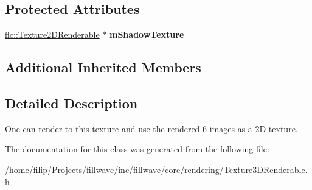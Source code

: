 \subsection*{Protected Attributes}
\begin{DoxyCompactItemize}
\item 
\hyperlink{classflw_1_1flc_1_1Texture2DRenderable}{flc\+::\+Texture2\+D\+Renderable} $\ast$ {\bfseries m\+Shadow\+Texture}\hypertarget{classflw_1_1flc_1_1Texture3DRenderable_a11a85d5786b2e207bccbb6a51f82ea9d}{}\label{classflw_1_1flc_1_1Texture3DRenderable_a11a85d5786b2e207bccbb6a51f82ea9d}

\end{DoxyCompactItemize}
\subsection*{Additional Inherited Members}


\subsection{Detailed Description}
One can render to this texture and use the rendered 6 images as a 2D texture. 

The documentation for this class was generated from the following file\+:\begin{DoxyCompactItemize}
\item 
/home/filip/\+Projects/fillwave/inc/fillwave/core/rendering/Texture3\+D\+Renderable.\+h\end{DoxyCompactItemize}
